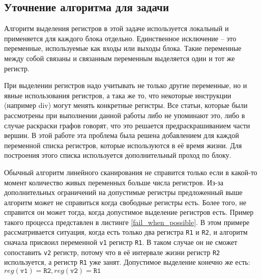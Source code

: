 \documentclass[a4paper,14pt]{extarticle}
\begin{document}

\subsection{Уточнение алгоритма для задачи}

Алгоритм выделения регистров в этой задаче используется локальный и применяется для каждого блока отдельно.
Единственное исключение -- это переменные, используемые как входы или выходы блока.
Такие переменные между собой связаны и связанным переменным выделяется один и тот же регистр.

При выделении регистров надо учитывать не только другие переменные, но и явные использования регистров, а така же то, что некоторые инструкции (например div) могут менять конкретные регистры.
Все статьи, которые были рассмотрены при выполнении данной работы либо не упоминают это, либо в случае раскраски графов говорят, что это решается предраскрашиванием части вершин.
В этой работе эта проблема была решена добавлением для каждой переменной списка регистров, которые используются в её время жизни.
Для построения этого списка используется дополнительный проход по блоку.

Обычный алгоритм линейного сканирования не справится только если в какой-то момент количество живых переменных больше числа регистров.
Из-за дополнительных ограничений на допустимые регистры предложенный выше алгоритм может не справиться когда свободные регистры есть.
Более того, не справится он может тогда, когда допустимое выделение регистров есть.
Пример такого процесса представлен в листинге \ref{fail_when_possible}.
В этом примере рассматривается ситуация, когда есть только два регистра \texttt{R1} и \texttt{R2}, и алгоритм сначала присвоил переменной \texttt{v1} регистр \texttt{R1}.
В таком случае он не сможет сопоставить \texttt{v2} регистр, потому что в её интервале жизни регистр \texttt{R2} используется, а регистр \texttt{R1} уже занят.
Допустимое выделение конечно же есть: $reg(\texttt{v1}) = \texttt{R2}, reg(\texttt{v2}) = \texttt{R1}$
\end{document}

